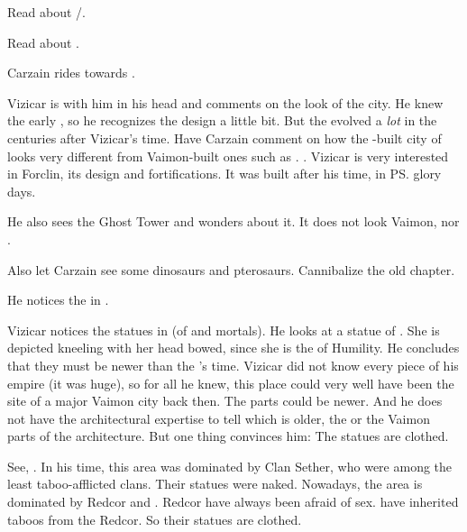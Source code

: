 
Read about /. 

Read about \Forclin. 
    
\begin{comment}
  \subsection{Carzain and Curwen}
\end{comment}
Carzain rides towards \Forklin.

Vizicar is with him in his head and comments on the look of the city. 
He knew the early \Ortaicans{}, so he recognizes the design a little bit. 
But the \Ortaicans{} evolved a \emph{lot} in the centuries after Vizicar's time. 
Have Carzain comment on how the \Ortaican-built city of \Forklin looks very different from Vaimon-built ones such as \Malcur. 
. 
Vizicar is very interested in Forclin, its design and fortifications. 
It was built after his time, in \ps{\Ortaica} glory days.

He also sees the Ghost Tower and wonders about it. 
It does not look Vaimon, nor \Ortaican.

Also let Carzain see some dinosaurs and pterosaurs. 
Cannibalize the old  chapter. 

He notices the  in \Forklin.

Vizicar notices the statues in \Forklin (of \sephiroth and mortals). 
He looks at a statue of \Feazirah. 
She is depicted kneeling with her head bowed, since she is the \sephirah of Humility.
He concludes that they must be newer than the \caliphate's time. 
Vizicar did not know every piece of his empire (it was huge), so for all he knew, this place could very well have been the site of a major Vaimon city back then. 
The \Ortaican parts could be newer. 
And he does not have the architectural expertise to tell which is older, the \Ortaican or the Vaimon parts of the architecture. 
But one thing convinces him: 
The statues are clothed. 

See, . 
In his time, this area was dominated by Clan Sether, who were among the least taboo-afflicted clans.
Their statues were naked. 
Nowadays, the area is dominated by Redcor and \Telcra.
Redcor have always been afraid of sex. 
\Telcra have inherited taboos from the Redcor. 
So their statues are clothed. 

